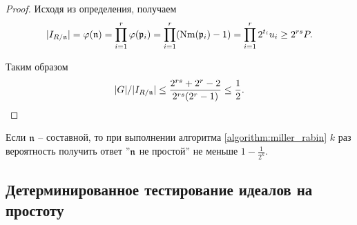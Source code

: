 \documentclass[_00_dissertation.tex]{subfiles}
\begin{document}
\begin{proof}
    Исходя из определения, получаем
    \begin{equation*}
        |I_{R/\mathfrak{n}}| = \varphi(\mathfrak{n}) = \prod_{i=1}^r \varphi(\mathfrak{p}_i) = \prod_{i=1}^r (\textrm{Nm}(\mathfrak{p}_i) - 1) = \prod_{i=1}^r 2^{t_i} u_i \ge 2^{rs} P.
    \end{equation*}

    Таким образом
    \begin{equation*}
        |G|/|I_{R/\mathfrak{n}}| \le \frac{2^{rs} + 2^r - 2}{2^{rs}(2^r - 1)} \le \frac{1}{2}.
    \end{equation*}
\end{proof}

\begin{remark}
    Если $\mathfrak{n}$ -- составной, то при выполнении алгоритма \ref{algorithm:miller_rabin} $k$ раз вероятность получить ответ ''$\mathfrak{n}$ не простой'' не меньше $1 - \frac{1}{2^k}$.
\end{remark}

\subsection{Детерминированное тестирование идеалов на простоту}

% 
% 
    
    
\end{document}
